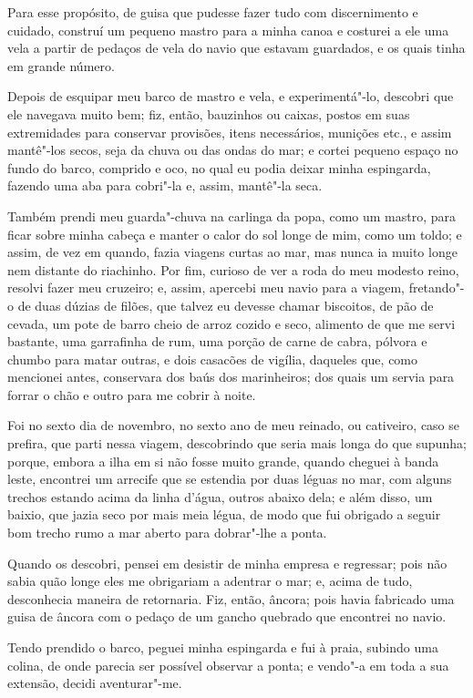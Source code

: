 Para esse propósito, de guisa que pudesse fazer tudo com discernimento e
cuidado, construí um pequeno mastro para a minha canoa e costurei a ele
uma vela a partir de pedaços de vela do navio que estavam guardados, e
os quais tinha em grande número.

Depois de esquipar meu barco de mastro e vela, e experimentá"-lo,
descobri que ele navegava muito bem; fiz, então, bauzinhos ou caixas,
postos em suas extremidades para conservar provisões, itens necessários,
munições etc., e assim mantê"-los secos, seja da chuva ou das ondas do
mar; e cortei pequeno espaço no fundo do barco, comprido e oco, no qual
eu podia deixar minha espingarda, fazendo uma aba para cobri"-la e,
assim, mantê"-la seca.

Também prendi meu guarda"-chuva na carlinga da popa, como um mastro, para
ficar sobre minha cabeça e manter o calor do sol longe de mim, como um
toldo; e assim, de vez em quando, fazia viagens curtas ao mar, mas nunca
ia muito longe nem distante do riachinho. Por fim, curioso de ver a roda
do meu modesto reino, resolvi fazer meu cruzeiro; e, assim, apercebi meu
navio para a viagem, fretando"-o de duas dúzias de filões, que talvez eu
devesse chamar biscoitos, de pão de cevada, um pote de barro cheio de
arroz cozido e seco, alimento de que me servi bastante, uma garrafinha
de rum, uma porção de carne de cabra, pólvora e chumbo para matar
outras, e dois casacões de vigília, daqueles que, como mencionei antes,
conservara dos baús dos marinheiros; dos quais um servia para forrar o
chão e outro para me cobrir à noite.

Foi no sexto dia de novembro, no sexto ano de meu reinado, ou cativeiro,
caso se prefira, que parti nessa viagem, descobrindo que seria mais
longa do que supunha; porque, embora a ilha em si não fosse muito
grande, quando cheguei à banda leste, encontrei um arrecife que se
estendia por duas léguas no mar, com alguns trechos estando acima da
linha d'água, outros abaixo dela; e além disso, um baixio, que jazia
seco por mais meia légua, de modo que fui obrigado a seguir bom trecho
rumo a mar aberto para dobrar"-lhe a ponta.

Quando os descobri, pensei em desistir de minha empresa e regressar;
pois não sabia quão longe eles me obrigariam a adentrar o mar; e, acima
de tudo, desconhecia maneira de retornaria. Fiz, então, âncora; pois
havia fabricado uma guisa de âncora com o pedaço de um gancho quebrado
que encontrei no navio.

Tendo prendido o barco, peguei minha espingarda e fui à praia, subindo
uma colina, de onde parecia ser possível observar a ponta; e vendo"-a em
toda a sua extensão, decidi aventurar"-me.


